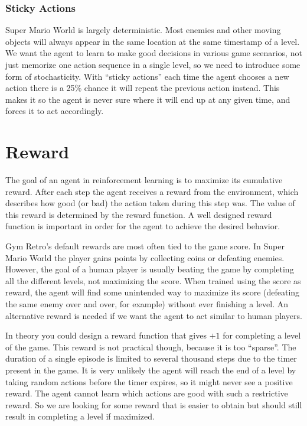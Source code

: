 \documentclass[a4paper]{article}
\begin{document}
\subsubsection{Sticky Actions}
Super Mario World is largely deterministic. 
Most enemies and other moving objects will always appear in the same location at the same timestamp of a level.
We want the agent to learn to make good decisions in various game scenarios, not just memorize one action sequence in a single level, so we need to introduce some form of stochasticity.
With ``sticky actions'' \cite{machado2018revisiting} each time the agent chooses a new action there is a 25\% chance it will repeat the previous action instead.
This makes it so the agent is never sure where it will end up at any given time, and forces it to act accordingly.

\section{Reward} \label{s:reward}
The goal of an agent in reinforcement learning is to maximize its cumulative reward.
After each step the agent receives a reward from the environment, which describes how good (or bad) the action taken during this step was.
The value of this reward is determined by the reward function.
A well designed reward function is important in order for the agent to achieve the desired behavior.

Gym Retro's default rewards are most often tied to the game score.
In Super Mario World the player gains points by collecting coins or defeating enemies.
However, the goal of a human player is usually beating the game by completing all the different levels, not maximizing the score.
When trained using the score as reward, the agent will find some unintended way to maximize its score (defeating the same enemy over and over, for example) without ever finishing a level.
An alternative reward is needed if we want the agent to act similar to human players.

In theory you could design a reward function that gives $+1$ for completing a level of the game.
This reward is not practical though, because it is too ``sparse''.
The duration of a single episode is limited to several thousand steps due to the timer present in the game.
It is very unlikely the agent will reach the end of a level by taking random actions before the timer expires, so it might never see a positive reward.
The agent cannot learn which actions are good with such a restrictive reward.
So we are looking for some reward that is easier to obtain but should still result in completing a level if maximized.
\end{document}
